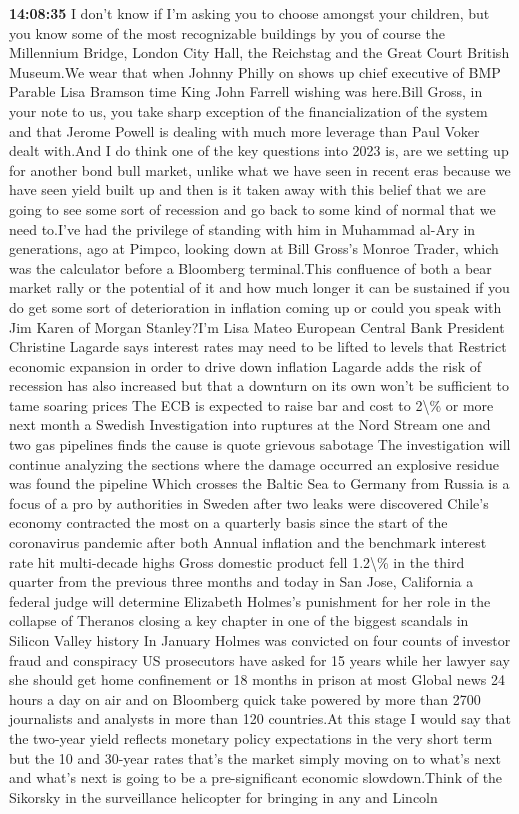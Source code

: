 \documentclass{article}%
\begin{document}
\textbf{14:08:35}%
\newline%
I don't know if I'm asking you to choose amongst your children, but you know some of the most recognizable buildings by you of course the Millennium Bridge, London City Hall, the Reichstag and the Great Court British Museum.We wear that when Johnny Philly on shows up chief executive of BMP Parable Lisa Bramson time King John Farrell wishing was here.Bill Gross, in your note to us, you take sharp exception of the financialization of the system and that Jerome Powell is dealing with much more leverage than Paul Voker dealt with.And I do think one of the key questions into 2023 is, are we setting up for another bond bull market, unlike what we have seen in recent eras because we have seen yield built up and then is it taken away with this belief that we are going to see some sort of recession and go back to some kind of normal that we need to.I've had the privilege of standing with him in Muhammad al{-}Ary in generations, ago at Pimpco, looking down at Bill Gross's Monroe Trader, which was the calculator before a Bloomberg terminal.This confluence of both a bear market rally or the potential of it and how much longer it can be sustained if you do get some sort of deterioration in inflation coming up or could you speak with Jim Karen of Morgan Stanley?I'm Lisa Mateo European Central Bank President Christine Lagarde says interest rates may need to be lifted to levels that Restrict economic expansion in order to drive down inflation Lagarde adds the risk of recession has also increased but that a downturn on its own won't be sufficient to tame soaring prices The ECB is expected to raise bar and cost to 2\textbackslash{}\% or more next month a Swedish Investigation into ruptures at the Nord Stream one and two gas pipelines finds the cause is quote grievous sabotage The investigation will continue analyzing the sections where the damage occurred an explosive residue was found the pipeline Which crosses the Baltic Sea to Germany from Russia is a focus of a pro by authorities in Sweden after two leaks were discovered Chile's economy contracted the most on a quarterly basis since the start of the coronavirus pandemic after both Annual inflation and the benchmark interest rate hit multi{-}decade highs Gross domestic product fell 1.2\textbackslash{}\% in the third quarter from the previous three months and today in San Jose, California a federal judge will determine Elizabeth Holmes's punishment for her role in the collapse of Theranos closing a key chapter in one of the biggest scandals in Silicon Valley history In January Holmes was convicted on four counts of investor fraud and conspiracy US prosecutors have asked for 15 years while her lawyer say she should get home confinement or 18 months in prison at most Global news 24 hours a day on air and on Bloomberg quick take powered by more than 2700 journalists and analysts in more than 120 countries.At this stage I would say that the two{-}year yield reflects monetary policy expectations in the very short term but the 10 and 30{-}year rates that's the market simply moving on to what's next and what's next is going to be a pre{-}significant economic slowdown.Think of the Sikorsky in the surveillance helicopter for bringing in any and Lincoln 
\end{document}
